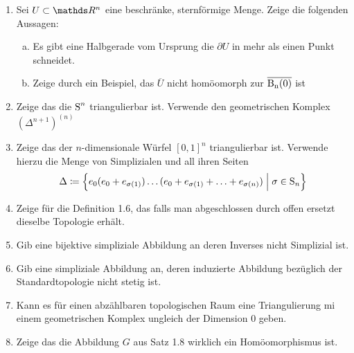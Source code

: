 \documentclass[ngerman]{scrartcl}
\begin{document}
\begin{Beh}
  \begin{enumerate}[(1)]
    \item Sei $U \subset \R^n$ eine beschränke, sternförmige Menge. Zeige 
      die folgenden Aussagen:
      \begin{enumerate}[a)]
        \item Es gibt eine Halbgerade vom Ursprung die $\partial U$ in mehr
          als einen Punkt schneidet.
        \item Zeige durch ein Beispiel, das $\overline{U}$ nicht homöomorph zur
          $\operatorname{\overline{\operatorname{B}_{n}(0)}}$ ist
      \end{enumerate}
    \item Zeige das die $\operatorname{S}^n$ triangulierbar ist. Verwende den
      geometrischen Komplex $(\Delta^{n+1})^{(n)}$
    \item Zeige das der $n$-dimensionale Würfel $[0,1]^n$
      triangulierbar ist.  Verwende hierzu die Menge von Simplizialen
      und all ihren Seiten
      \begin{gather*}
        \Delta \coloneqq \left\{  e_0 (e_0 + e_{\sigma(1)}) \ldots (e_0 +
          e_{\sigma(1)} + \ldots + e_{\sigma(n)})  \; \Big| \;  \sigma \in \operatorname{S}_n \right\}
      \end{gather*}
    \item Zeige für die Definition 1.6, das falls man abgeschlossen
      durch offen ersetzt dieselbe Topologie erhält.
    \item Gib eine bijektive simpliziale Abbildung an deren Inverses
      nicht Simplizial ist.
    \item Gib eine simpliziale Abbildung an, deren induzierte
      Abbildung bezüglich der Standardtopologie nicht stetig ist.
    \item Kann es für einen abzählbaren topologischen Raum eine
      Triangulierung mi einem geometrischen Komplex ungleich der
      Dimension $0$ geben.
    \item Zeige das die Abbildung $G$ aus Satz 1.8 wirklich ein
      Homöomorphismus ist.
    \end{enumerate}
\end{Beh}

\end{document}
